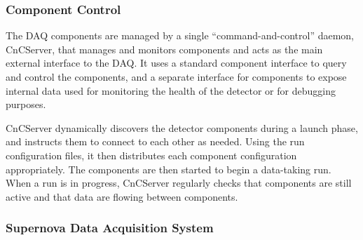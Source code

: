 \subsubsection{Component Control}

The DAQ components are managed by a single ``command-and-control'' daemon,
CnCServer, that manages and monitors components and acts as the main
external interface to the DAQ.  It uses a standard component interface to query and
control the components, and a separate interface for components to expose
internal data used for monitoring the health of the detector or for
debugging purposes.

CnCServer dynamically discovers the detector components during a launch
phase, and instructs them to connect to each other as needed.  Using the
run configuration files, it then distributes each component configuration
appropriately.  The components are then started to begin a data-taking run.
When a run is in progress, CnCServer regularly checks that components are
still active and that data are flowing between components.




\subsubsection{\label{sect:SNDAQ}Supernova Data Acquisition System}

